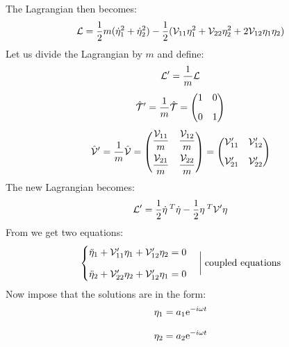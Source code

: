 The Lagrangian then becomes:
\begin{equation}
    \mathcal{L} = \dfrac{1}{2}m(\dot{\eta}_1^2 + \dot{\eta}_2^2) - \dfrac{1}{2}(\mathcal{V}_{11}\eta_1^2 + \mathcal{V}_{22}\eta_2^2 + 2\mathcal{V}_{12}\eta_1\eta_2 )
\end{equation}
Let us divide the Lagrangian by $m$ and define:
\begin{equation}
    \mathcal{L}' = \dfrac{1}{m}\mathcal{L}
\end{equation}
\begin{equation}
    \hat{\mathcal{T}}' = \dfrac{1}{m}\hat{\mathcal{T}} = \begin{pmatrix}
        1 & 0\\[8pt]
        0 & 1
    \end{pmatrix}
\end{equation}
\begin{equation}
    \hat{\mathcal{V}}' = \dfrac{1}{m}\hat{\mathcal{V}} = \begin{pmatrix}
        \dfrac{\mathcal{V}_{11}}{m} & \dfrac{\mathcal{V}_{12}}{m}\\[8pt]
        \dfrac{\mathcal{V}_{21}}{m} & \dfrac{\mathcal{V}_{22}}{m}
    \end{pmatrix} = \begin{pmatrix}
        \mathcal{V}_{11}' & \mathcal{V}_{12}'\\[8pt]
        \mathcal{V}_{21}' & \mathcal{V}_{22}'
    \end{pmatrix}
\end{equation}
The new Lagrangian becomes:
\begin{equation}
    \mathcal{L}' = \dfrac{1}{2}\dot{\vb{\eta}}^{\;T} \dot{\vb{\eta}} - \dfrac{1}{2}\vb{\eta}^{\;T} \mathcal{V}' \vb{\eta}
\end{equation}
From \eleref\;we get two equations:
\begin{equation}
    \begin{cases}
        \ddot{\eta}_1 + \mathcal{V}'_{11}\eta_1 + \mathcal{V}'_{12}\eta_2 = 0\\[8pt]
        \ddot{\eta}_2 + \mathcal{V}'_{22}\eta_2 + \mathcal{V}'_{12}\eta_1 = 0
    \end{cases} \bigg|\;\text{coupled equations}
\end{equation}
Now impose that the solutions are in the form:
\begin{equation}
    \begin{split}
        \eta_1 = a_1\mathrm{e}^{-i\omega t} \\[8pt]
        \eta_2 = a_2\mathrm{e}^{-i\omega t}
    \end{split}
\end{equation}
